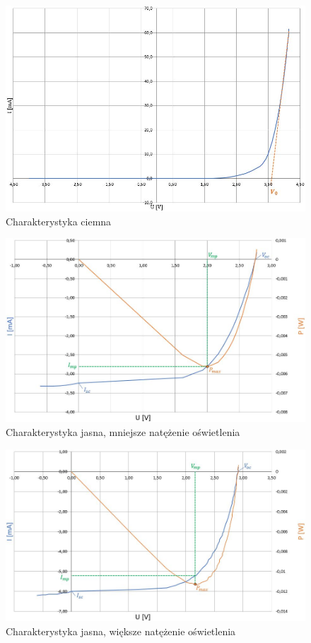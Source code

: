 \documentclass[polish, 11pt, a4paper]{article}
\begin{document}
		\begin{figure}[H]
			\centering
			\caption{Charakterystyka ciemna}
			\includegraphics[width=\textwidth]{Fizyka104Wykres1}
		\end{figure}
	
		\begin{figure}[H]
			\centering
			\caption{Charakterystyka jasna, mniejsze natężenie oświetlenia}
			\includegraphics[width=\textwidth]{Fizyka104Wykres2}
		\end{figure}
	
		\begin{figure}[H]
			\centering
			\caption{Charakterystyka jasna, większe natężenie oświetlenia}
			\includegraphics[width=\textwidth]{Fizyka104Wykres3}
		\end{figure}
		
\end{document}
